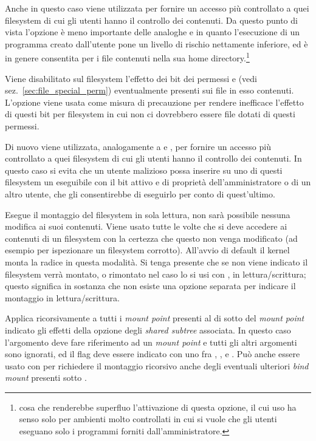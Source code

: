 \begin{basedescript}{\desclabelwidth{2.0cm}\desclabelstyle{\nextlinelabel}}
  Anche in questo caso viene utilizzata per fornire un accesso più controllato
  a quei filesystem di cui gli utenti hanno il controllo dei contenuti. Da
  questo punto di vista l'opzione è meno importante delle analoghe
   e  in quanto l'esecuzione di un
  programma creato dall'utente pone un livello di rischio nettamente
  inferiore, ed è in genere consentita per i file contenuti nella sua home
  directory.\footnote{cosa che renderebbe superfluo l'attivazione di questa
    opzione, il cui uso ha senso solo per ambienti molto controllati in cui si
    vuole che gli utenti eseguano solo i programmi forniti
    dall'amministratore.}

\item[\constd{MS\_NOSUID}] Viene disabilitato sul filesystem l'effetto dei bit
  dei permessi  e  (vedi sez.~\ref{sec:file_special_perm})
  eventualmente presenti sui file in esso contenuti. L'opzione viene usata
  come misura di precauzione per rendere inefficace l'effetto di questi bit
  per filesystem in cui non ci dovrebbero essere file dotati di questi
  permessi.

  Di nuovo viene utilizzata, analogamente a  e
  , per fornire un accesso più controllato a quei filesystem
  di cui gli utenti hanno il controllo dei contenuti. In questo caso si evita
  che un utente malizioso possa inserire su uno di questi filesystem un
  eseguibile con il bit  attivo e di proprietà dell'amministratore o
  di un altro utente, che gli consentirebbe di eseguirlo per conto di
  quest'ultimo.

\item[\constd{MS\_RDONLY}] Esegue il montaggio del filesystem in sola lettura,
  non sarà possibile nessuna modifica ai suoi contenuti. Viene usato tutte le
  volte che si deve accedere ai contenuti di un filesystem con la certezza che
  questo non venga modificato (ad esempio per ispezionare un filesystem
  corrotto). All'avvio di default il kernel monta la radice in questa
  modalità. Si tenga presente che se non viene indicato il filesystem verrà
  montato, o rimontato nel caso lo si usi con , in
  lettura/scrittura; questo significa in sostanza che non esiste una opzione
  separata per indicare il montaggio in lettura/scrittura.

\item[\constd{MS\_REC}] Applica ricorsivamente a tutti i \textit{mount point}
  presenti al di sotto del \textit{mount point} indicato gli effetti della
  opzione degli \textit{shared subtree} associata. In questo caso l'argomento
   deve fare riferimento ad un \textit{mount point} e tutti gli
  altri argomenti sono ignorati, ed il flag deve essere indicato con uno fra
  , ,  e
  . Può anche essere usato con  per
  richiedere il montaggio ricorsivo anche degli eventuali ulteriori
  \textit{bind mount} presenti sotto .


\end{basedescript}
